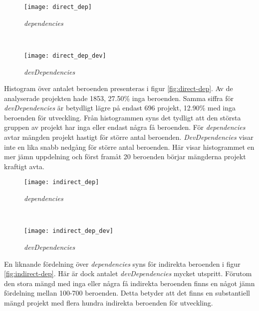 \begin{figure*}
    \centering
    \begin{subfigure}[]{0.5\textwidth}
        \centering
        \texttt{[image: direct\_dep]}
        \caption{\textit{dependencies}}
    \end{subfigure}%
    ~
    \begin{subfigure}[]{0.5\textwidth}
        \centering
        \texttt{[image: direct\_dep\_dev]}
        \caption{\textit{devDependencies}}
    \end{subfigure}
    \caption{Histogram över projekt med maximalt 50 direkta beroenden}
    \label{fig:direct-dep}
\end{figure*}

Histogram över antalet beroenden presenteras i figur \ref{fig:direct-dep}. Av de analyserade projekten hade 1853, 27.50\% inga beroenden. Samma siffra för \textit{devDependencies} är betydligt lägre på endast 696 projekt, 12.90\% med inga beroenden för utveckling. Från histogrammen syns det tydligt att den största gruppen av projekt har inga eller endast några få beroenden. För \textit{dependencies} avtar mängden projekt hastigt för större antal beroenden. \textit{DevDependencies} visar inte en lika snabb nedgång för större antal beroenden. Här visar histogrammet en mer jämn uppdelning och först framåt 20 beroenden börjar mängderna projekt kraftigt avta.

\begin{figure*}
    \centering
    \begin{subfigure}[]{0.5\textwidth}
        \centering
        \texttt{[image: indirect\_dep]}
        \caption{\textit{dependencies}}
    \end{subfigure}%
    ~
    \begin{subfigure}[]{0.5\textwidth}
        \centering
        \texttt{[image: indirect\_dep\_dev]}
        \caption{\textit{devDependencies}}
    \end{subfigure}
    \caption{Histogram över projekt med maximalt 1800 indirekta beroenden}
    \label{fig:indirect-dep}
\end{figure*}

En liknande fördelning över \textit{dependencies} syns för indirekta beroenden i figur \ref{fig:indirect-dep}. Här är dock antalet \textit{devDependencies} mycket utspritt. Förutom den stora mängd med inga eller några få indirekta beroenden finns en något jämn fördelning mellan 100-700 beroenden. Detta betyder att det finns en substantiell mängd projekt med flera hundra indirekta beroenden för utveckling.

